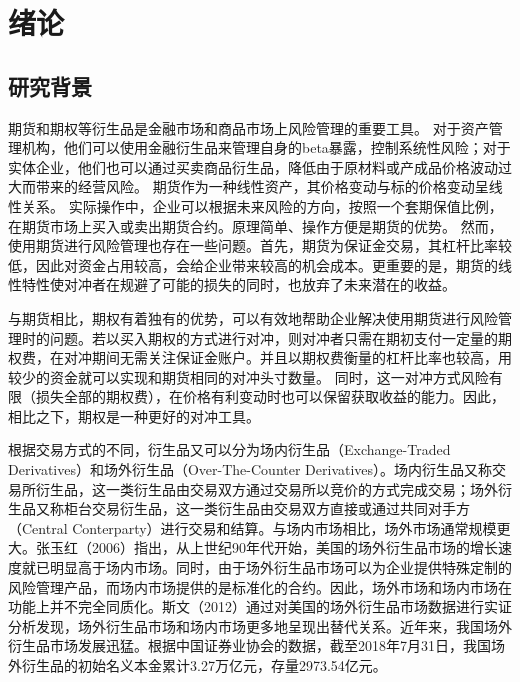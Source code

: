 
\chapter{绪论}
\label{chap:intro}

\section{研究背景}

期货和期权等衍生品是金融市场和商品市场上风险管理的重要工具。
对于资产管理机构，他们可以使用金融衍生品来管理自身的beta暴露，控制系统性风险；对于实体企业，他们也可以通过买卖商品衍生品，降低由于原材料或产成品价格波动过大而带来的经营风险。
期货作为一种线性资产，其价格变动与标的价格变动呈线性关系。
实际操作中，企业可以根据未来风险的方向，按照一个套期保值比例，在期货市场上买入或卖出期货合约。原理简单、操作方便是期货的优势。
然而，使用期货进行风险管理也存在一些问题。首先，期货为保证金交易，其杠杆比率较低，因此对资金占用较高，会给企业带来较高的机会成本。更重要的是，期货的线性特性使对冲者在规避了可能的损失的同时，也放弃了未来潜在的收益。

与期货相比，期权有着独有的优势，可以有效地帮助企业解决使用期货进行风险管理时的问题。若以买入期权的方式进行对冲，则对冲者只需在期初支付一定量的期权费，在对冲期间无需关注保证金账户。并且以期权费衡量的杠杆比率也较高，用较少的资金就可以实现和期货相同的对冲头寸数量。
同时，这一对冲方式风险有限（损失全部的期权费），在价格有利变动时也可以保留获取收益的能力。因此，相比之下，期权是一种更好的对冲工具。

根据交易方式的不同，衍生品又可以分为场内衍生品（Exchange-Traded Derivatives）和场外衍生品（Over-The-Counter Derivatives）。场内衍生品又称交易所衍生品，这一类衍生品由交易双方通过交易所以竞价的方式完成交易；场外衍生品又称柜台交易衍生品，这一类衍生品由交易双方直接或通过共同对手方（Central Conterparty）进行交易和结算。与场内市场相比，场外市场通常规模更大。张玉红（2006）指出，从上世纪90年代开始，美国的场外衍生品市场的增长速度就已明显高于场内市场。同时，由于场外衍生品市场可以为企业提供特殊定制的风险管理产品，而场内市场提供的是标准化的合约。因此，场外市场和场内市场在功能上并不完全同质化。斯文（2012）通过对美国的场外衍生品市场数据进行实证分析发现，场外衍生品市场和场内市场更多地呈现出替代关系。近年来，我国场外衍生品市场发展迅猛。根据中国证券业协会的数据，截至2018年7月31日，我国场外衍生品的初始名义本金累计3.27万亿元，存量2973.54亿元。

